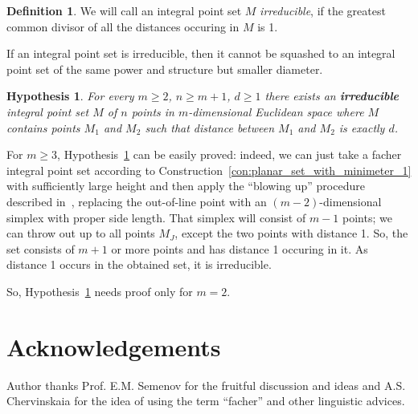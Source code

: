 \documentclass[a4paper,14pt]{article} %
\theoremstyle{plain}
\newtheorem{hypothesis}[theorem]{Hypothesis}
\theoremstyle{definition}
\newtheorem{definition}[theorem]{Definition}
\begin{document}
\begin{definition}
	We will call an integral point set $M$ \textit{irreducible}, if the greatest common divisor
	of all the distances occuring in $M$ is 1.
\end{definition}

If an integral point set is irreducible,
then it cannot be squashed to an integral point set of the same power and structure but smaller diameter.

\begin{hypothesis}
	\label{hyp:irreducible_planar}
	For every $m \geq 2$, $n \geq m+1$, $d \geq 1$ there exists an \textbf{irreducible}
	integral point set $M$ of $n$ points in $m$-dimensional Euclidean space
	where $M$ contains points $M_1$ and $M_2$ such that distance between $M_1$ and $M_2$ is exactly $d$.
\end{hypothesis}

For $m \geq 3$, Hypothesis~\ref{hyp:irreducible_planar} can be easily proved:
indeed, we can just take a facher integral point set according to Construction~\ref{con:planar_set_with_minimeter_1}
with sufficiently large height and then apply the ``blowing up'' procedure described in~\cite[Theorem 1.3]{kurz2008bounds},
replacing the out-of-line point with an $(m-2)$-dimensional simplex with proper side length.
That simplex will consist of $m-1$ points;
we can throw out up to all points $M_J$, except the two points with distance 1.
So, the set consists of $m+1$ or more points and has distance 1 occuring in it.
As distance 1 occurs in the obtained set, it is irreducible.

So, Hypothesis~\ref{hyp:irreducible_planar} needs proof only for $m=2$.

\section{Acknowledgements}
Author thanks Prof. E.M. Semenov for the fruitful discussion and ideas
and A.S. Chervinskaia for the idea of using the term ``facher'' and other linguistic advices.


\printbibliography
\end{document}
